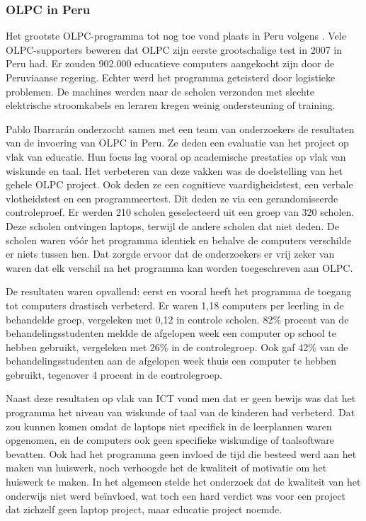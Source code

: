 \subsubsection{OLPC in Peru}
Het grootste OLPC-programma tot nog toe vond plaats in Peru volgens \autocite{Trucano2012}. Vele OLPC-supporters beweren dat OLPC zijn eerste grootschalige test in 2007 in Peru had. Er zouden 902.000 educatieve computers aangekocht zijn door de Peruviaanse regering. Echter werd het programma geteisterd door logistieke problemen. De machines werden naar de scholen verzonden met slechte elektrische stroomkabels en leraren kregen weinig ondersteuning of training. \autocite{Robertson2018}

Pablo Ibarrarán onderzocht samen met een team van onderzoekers de resultaten van de invoering van OLPC in Peru. \autocite{Ibarraran2012} Ze deden een evaluatie van het project op vlak van educatie. Hun focus lag vooral op academische prestaties op vlak van wiskunde en taal. Het verbeteren van deze vakken was de doelstelling van het gehele OLPC project. Ook deden ze een cognitieve vaardigheidstest, een verbale vlotheidstest en een programmeertest. Dit deden ze via een gerandomiseerde controleproef. Er werden 210 scholen geselecteerd uit een groep van 320 scholen. Deze scholen ontvingen laptops, terwijl de andere scholen dat niet deden. De scholen waren vóór het programma identiek en behalve de computers verschilde er niets tussen hen. Dat zorgde ervoor dat de onderzoekers er vrij zeker van waren dat elk verschil na het programma kan worden toegeschreven aan OLPC. \autocite{Ibarraran2012}

De resultaten waren opvallend: eerst en vooral heeft het programma de toegang tot computers drastisch verbeterd. Er waren 1,18 computers per leerling in de behandelde groep, vergeleken met 0,12 in controle scholen. 82\% procent van de behandelingsstudenten meldde de afgelopen week een computer op school te hebben gebruikt, vergeleken met 26\% in de controlegroep. Ook gaf 42\% van de behandelingsstudenten aan de afgelopen week thuis een computer te hebben gebruikt, tegenover 4 procent in de controlegroep. \autocite{Ibarraran2012}

Naast deze resultaten op vlak van ICT vond men dat er geen bewijs was dat het programma het niveau van wiskunde of taal van de kinderen had verbeterd. Dat zou kunnen komen omdat de laptops niet specifiek in de leerplannen waren opgenomen, en de computers ook geen specifieke wiskundige of taalsoftware bevatten. Ook had het programma geen invloed de tijd die besteed werd aan het maken van huiswerk, noch verhoogde het de kwaliteit of motivatie om het huiswerk te maken. In het algemeen stelde het onderzoek dat de kwaliteit van het onderwijs niet werd beïnvloed, wat toch een hard verdict was voor een project dat zichzelf geen laptop project, maar educatie project noemde. \autocite{Ibarraran2012}


